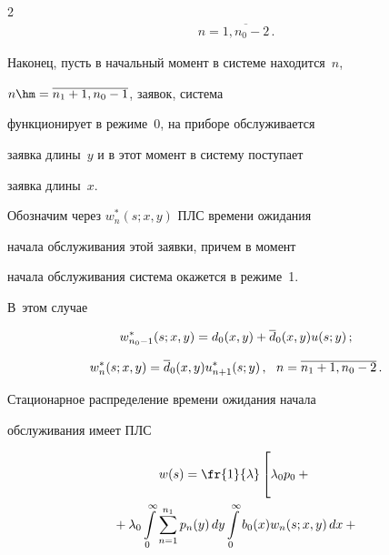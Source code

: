 \begin{multicols}{2}
\begin{multline*}
n=\overline{1,n_0-2}\,.


\end{multline*}





Наконец, пусть в начальный момент в системе находится~$n$, 


$n\hm=\overline{n_1+1,n_0-1}$, заявок, система


функционирует в режиме~0, на приборе обслуживается


заявка длины~$y$ и в этот момент в систему поступает


заявка длины~$x$.


Обозначим через $w^*_n(s;x,y)$ ПЛС времени ожидания


начала обслуживания этой заявки, причем в момент


начала обслуживания сис\-те\-ма окажется в режиме~1.


В~этом случае


\begin{equation}


\label{5-3-3-m}


w^*_{n_0-1}(s;x,y) = d_0(x,y) + \d_0(x,y) u(s;y)\,;


\end{equation}




$$


w^*_n(s;x,y) = \d_0(x,y) u^*_{n+1}(s;y)\,,\ \ n=\overline{n_1+1,n_0-2} \,.


$$








Стационарное распределение времени ожидания начала


обслуживания имеет ПЛС


\begin{multline*}




w(s) = \fr{1}{ \lambda} \left[ \vphantom{\int\limits_0^\infty}


\lambda_0 p_0+{}\right.\\


{}+ \lambda_0 \int\limits_0^\infty \sum\limits_{n=1}^{n_1}


p_n(y) \, dy \int\limits_0^\infty b_0(x) w_n(s;x,y) \, dx


+{}


\\



\end{multline*}
\end{multicols}
